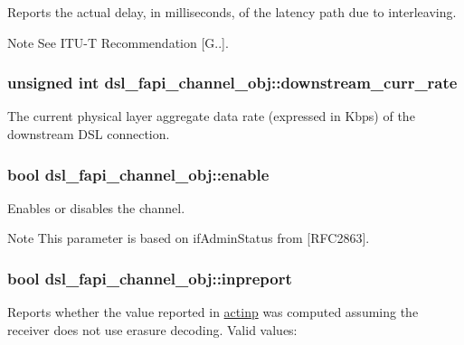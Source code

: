 Reports the actual delay, in milliseconds, of the latency path due to interleaving. \begin{DoxyNote}{Note}
See I\-T\-U-\/\-T Recommendation \mbox{[}G..\mbox{]}. 
\end{DoxyNote}
\hypertarget{structdsl__fapi__channel__obj_ab116fbbd314f1984713b84a9e9c0cf2f}{
\subsubsection[{downstream\-\_\-curr\-\_\-rate}]{\setlength{\rightskip}{0pt plus 5cm}unsigned int dsl\-\_\-fapi\-\_\-channel\-\_\-obj\-::downstream\-\_\-curr\-\_\-rate}}\label{structdsl__fapi__channel__obj_ab116fbbd314f1984713b84a9e9c0cf2f}
The current physical layer aggregate data rate (expressed in Kbps) of the downstream D\-S\-L connection. \hypertarget{structdsl__fapi__channel__obj_a092522adc02a3729ba22c4d564e253b9}{
\subsubsection[{enable}]{\setlength{\rightskip}{0pt plus 5cm}bool dsl\-\_\-fapi\-\_\-channel\-\_\-obj\-::enable}}\label{structdsl__fapi__channel__obj_a092522adc02a3729ba22c4d564e253b9}
Enables or disables the channel. \begin{DoxyNote}{Note}
This parameter is based on if\-Admin\-Status from \mbox{[}R\-F\-C2863\mbox{]}. 
\end{DoxyNote}
\hypertarget{structdsl__fapi__channel__obj_ab6473968098d99af963b754467b7e17c}{
\subsubsection[{inpreport}]{\setlength{\rightskip}{0pt plus 5cm}bool dsl\-\_\-fapi\-\_\-channel\-\_\-obj\-::inpreport}}\label{structdsl__fapi__channel__obj_ab6473968098d99af963b754467b7e17c}
Reports whether the value reported in \hyperlink{structdsl__fapi__channel__obj_af95a0127772d8831b6fdd5e07dbf3964}{actinp} was computed assuming the receiver does not use erasure decoding. Valid values\-:
